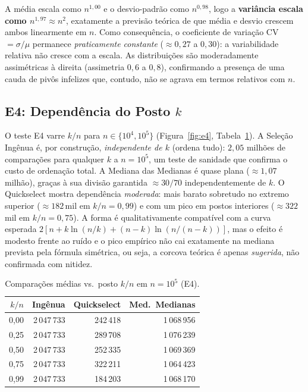 \documentclass{infufrgs}
\begin{document}
A média escala como $n^{1{,}00}$ e o desvio-padrão como $n^{0{,}98}$, logo a \textbf{variância escala como $n^{1{,}97} \approx n^2$}, exatamente a previsão teórica de que média e desvio crescem ambos linearmente em $n$. Como consequência, o coeficiente de variação CV $= \sigma/\mu$ permanece \emph{praticamente constante} ($\approx 0{,}27$ a $0{,}30$): a variabilidade relativa não cresce com a escala. As distribuições são moderadamente assimétricas à direita (assimetria $0{,}6$ a $0{,}8$), confirmando a presença de uma cauda de pivôs infelizes que, contudo, não se agrava em termos relativos com $n$.

\subsection{E4: Dependência do Posto $k$}

O teste E4 varre $k/n$ para $n \in \{10^4, 10^5\}$ (Figura~\ref{fig:e4}, Tabela~\ref{tab:e4}). A Seleção Ingênua é, por construção, \emph{independente de $k$} (ordena tudo): $2{,}05$ milhões de comparações para qualquer $k$ a $n = 10^5$, um teste de sanidade que confirma o custo de ordenação total. A Mediana das Medianas é quase plana ($\approx 1{,}07$ milhão), graças à sua divisão garantida $\approx 30/70$ independentemente de $k$. O Quickselect mostra dependência \emph{moderada}: mais barato sobretudo no extremo superior ($\approx 182$\,mil em $k/n = 0{,}99$) e com um pico em postos interiores ($\approx 322$\,mil em $k/n = 0{,}75$). A forma é qualitativamente compatível com a curva esperada $2[n + k\ln(n/k) + (n-k)\ln(n/(n-k))]$, mas o efeito é modesto frente ao ruído e o pico empírico não cai exatamente na mediana prevista pela fórmula simétrica, ou seja, a corcova teórica é apenas \emph{sugerida}, não confirmada com nitidez.

\begin{table}[H]
\centering
\caption{Comparações médias vs.\ posto $k/n$ em $n = 10^5$ (E4).}
\label{tab:e4}
\begin{tabular}{rrrr}
\toprule
$k/n$ & Ingênua & Quickselect & Med.\ Medianas \\
\midrule
0{,}00 & 2\,047\,733 & 242\,418 & 1\,068\,956 \\
0{,}25 & 2\,047\,733 & 289\,708 & 1\,076\,239 \\
0{,}50 & 2\,047\,733 & 252\,335 & 1\,069\,369 \\
0{,}75 & 2\,047\,733 & 322\,211 & 1\,064\,423 \\
0{,}99 & 2\,047\,733 & 184\,203 & 1\,068\,170 \\
\bottomrule
\end{tabular}
\end{table}
\end{document}
